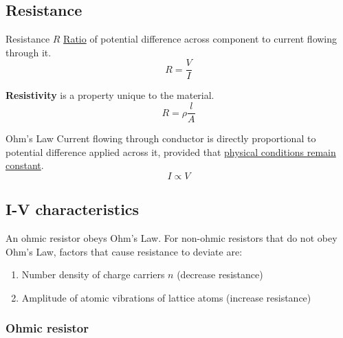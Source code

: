 \subsection{Resistance}
\begin{defn}{Resistance $R$}{}
\underline{Ratio} of potential difference across component to current flowing through it.
\begin{equation}
R = \frac{V}{I}
\end{equation}
\end{defn}

\textbf{Resistivity} is a property unique to the material.
\begin{equation}
R = \rho \frac{l}{A}
\end{equation}

\begin{defn}{Ohm's Law}{}
Current flowing through conductor is directly proportional to potential difference applied across it, provided that \underline{physical conditions remain constant}.
\begin{equation}
I \propto V
\end{equation}
\end{defn}
\pagebreak

\subsection{I-V characteristics}
An ohmic resistor obeys Ohm's Law. For non-ohmic resistors that do not obey Ohm's Law, factors that cause resistance to deviate are:
\begin{enumerate}
\item Number density of charge carriers $n$ (decrease resistance)
\item Amplitude of atomic vibrations of lattice atoms (increase resistance)
\end{enumerate}

\subsubsection{Ohmic resistor}

\begin{figure}[H]
\centering
{}
\end{figure}

